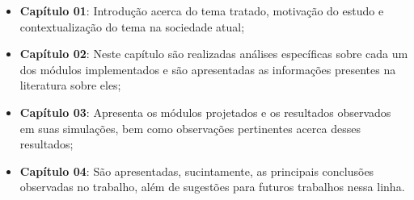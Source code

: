 \begin{itemize}
	\item \textbf{Capítulo 01}: Introdução acerca do tema tratado, motivação do estudo e contextualização do tema na sociedade atual;
	\item \textbf{Capítulo 02}: Neste capítulo são realizadas análises específicas sobre cada um dos módulos implementados e são apresentadas as informações presentes na literatura sobre eles;
	\item \textbf{Capítulo 03}: Apresenta os módulos projetados e os resultados observados em suas simulações, bem como observações pertinentes acerca desses resultados;
	\item \textbf{Capítulo 04}: São apresentadas, sucintamente, as principais conclusões observadas no trabalho, além de sugestões para futuros trabalhos nessa linha.
\end{itemize}
